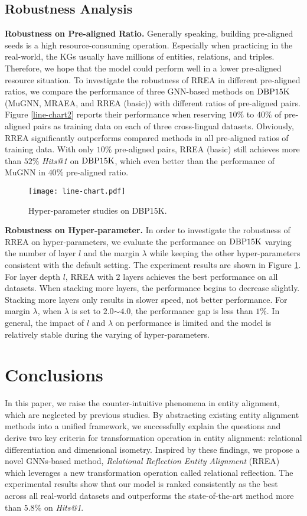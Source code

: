 \documentclass[sigconf,camera-ready]{acmart}
\begin{document}
\subsection{Robustness Analysis}
\textbf{Robustness on Pre-aligned Ratio.}
Generally speaking, building pre-aligned seeds is a high resource-consuming operation.
Especially when practicing in the real-world, the KGs usually have millions of entities, relations, and triples.
Therefore, we hope that the model could perform well in a lower pre-aligned resource situation.
To investigate the robustness of RREA in different pre-aligned ratios, we compare the performance of three GNN-based methods on $\rm{DBP15K}$ (MuGNN, MRAEA, and RREA (basic)) with different ratios of pre-aligned pairs.
Figure \ref{line-chart2} reports their performance when reserving $10\%$ to $40\%$ of pre-aligned pairs as training data on each of three cross-lingual datasets.
Obviously, RREA significantly outperforms compared methods in all pre-aligned ratios of training data.
With only $10\%$ pre-aligned pairs, RREA (basic) still achieves more than $52\%$ \emph{Hits@1} on $\rm DBP15K$, which even better than the performance of MuGNN in $40\%$ pre-aligned ratio.

\begin{figure}[t]
  \texttt{[image: line-chart.pdf]}\\
  \caption{Hyper-parameter studies on DBP15K.}
  \label{line-chart}
\end{figure}
\noindent
\textbf{Robustness on Hyper-parameter.}
In order to investigate the robustness of RREA on hyper-parameters, we evaluate the performance on $\rm DBP15K$ varying the number of layer $l$  and the margin $\lambda$
while keeping the other hyper-parameters consistent with the default setting.
The experiment results are shown in Figure \ref{line-chart}.
For layer depth $l$, RREA with $2$ layers achieves the best performance on all datasets.
When stacking more layers, the performance begins to decrease slightly.
Stacking more layers only results in slower speed, not better performance.
For margin $\lambda$, when $\lambda$ is set to $2.0$$\sim$$4.0$, the performance gap is less than $1\%$.
In general, the impact of $l$ and $\lambda$ on performance is limited and the model is relatively stable during the varying of hyper-parameters.

\section{Conclusions}
In this paper, we raise the counter-intuitive phenomena in entity alignment, which are neglected by previous studies.
By abstracting existing entity alignment methods into a unified framework, we successfully explain the questions and derive two key criteria for transformation operation in entity alignment:
relational differentiation and dimensional isometry.
Inspired by these findings, we propose a novel GNNs-based method, \emph{Relational Reflection Entity Alignment} (RREA) which leverages a new transformation operation called relational reflection.
The experimental results show that our model is ranked consistently as the best across all real-world datasets and outperforms the state-of-the-art method more than $5.8$\% on \emph{Hits@1}.




\appendix
\end{document}
